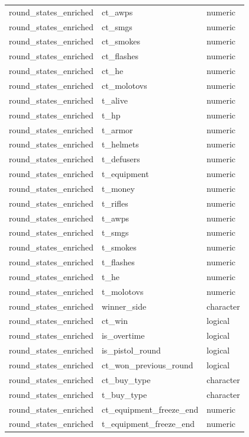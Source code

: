 \documentclass[
  letterpaper,
  DIV=11,
  numbers=noendperiod]{scrartcl}
\begin{document}
{\begin{longtable}[]{@{}lll@{}}
round\_states\_enriched & ct\_awps & numeric \\
round\_states\_enriched & ct\_smgs & numeric \\
round\_states\_enriched & ct\_smokes & numeric \\
round\_states\_enriched & ct\_flashes & numeric \\
round\_states\_enriched & ct\_he & numeric \\
round\_states\_enriched & ct\_molotovs & numeric \\
round\_states\_enriched & t\_alive & numeric \\
round\_states\_enriched & t\_hp & numeric \\
round\_states\_enriched & t\_armor & numeric \\
round\_states\_enriched & t\_helmets & numeric \\
round\_states\_enriched & t\_defusers & numeric \\
round\_states\_enriched & t\_equipment & numeric \\
round\_states\_enriched & t\_money & numeric \\
round\_states\_enriched & t\_rifles & numeric \\
round\_states\_enriched & t\_awps & numeric \\
round\_states\_enriched & t\_smgs & numeric \\
round\_states\_enriched & t\_smokes & numeric \\
round\_states\_enriched & t\_flashes & numeric \\
round\_states\_enriched & t\_he & numeric \\
round\_states\_enriched & t\_molotovs & numeric \\
round\_states\_enriched & winner\_side & character \\
round\_states\_enriched & ct\_win & logical \\
round\_states\_enriched & is\_overtime & logical \\
round\_states\_enriched & is\_pistol\_round & logical \\
round\_states\_enriched & ct\_won\_previous\_round & logical \\
round\_states\_enriched & ct\_buy\_type & character \\
round\_states\_enriched & t\_buy\_type & character \\
round\_states\_enriched & ct\_equipment\_freeze\_end & numeric \\
round\_states\_enriched & t\_equipment\_freeze\_end & numeric \\

\end{longtable}}
\end{document}
